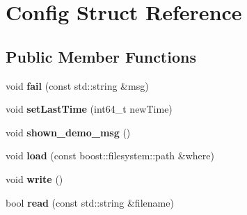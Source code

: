 \hypertarget{struct_config}{\section{Config Struct Reference}
\label{struct_config}
}
\subsection*{Public Member Functions}
\begin{DoxyCompactItemize}
\item 
\hypertarget{struct_config_abd04feb31c5597f231c2b0a846880421}{void {\bfseries fail} (const std\-::string \&msg)}\label{struct_config_abd04feb31c5597f231c2b0a846880421}

\item 
\hypertarget{struct_config_ab23cf64dbe467847929cc97a190135f6}{void {\bfseries set\-Last\-Time} (int64\-\_\-t new\-Time)}\label{struct_config_ab23cf64dbe467847929cc97a190135f6}

\item 
\hypertarget{struct_config_acd40ebac23c7a2482a5d05c9f45a6431}{void {\bfseries shown\-\_\-demo\-\_\-msg} ()}\label{struct_config_acd40ebac23c7a2482a5d05c9f45a6431}

\item 
\hypertarget{struct_config_a9a2cf83a170bd24727275d0ceae5d096}{void {\bfseries load} (const boost\-::filesystem\-::path \&where)}\label{struct_config_a9a2cf83a170bd24727275d0ceae5d096}

\item 
\hypertarget{struct_config_ad4706c80584efb50585338d051a777eb}{void {\bfseries write} ()}\label{struct_config_ad4706c80584efb50585338d051a777eb}

\item 
\hypertarget{struct_config_a72c04e1d5ec82869d7f99f4dbf4d415d}{bool {\bfseries read} (const std\-::string \&filename)}\label{struct_config_a72c04e1d5ec82869d7f99f4dbf4d415d}

\end{DoxyCompactItemize}
